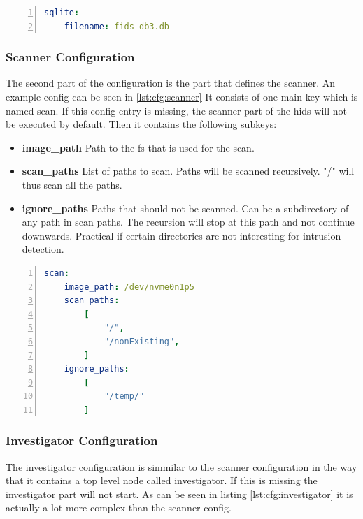 \begin{lstlisting}[language=yaml, numbers=left, caption=SQLite Configuration, label=lst:cfg:sqlite]
sqlite:
	filename: fids_db3.db
\end{lstlisting}

\subsubsection{Scanner Configuration}

The second part of the configuration is the part that defines the scanner. An example config can be seen in \ref{lst:cfg:scanner} It consists of one main key which is named scan. If this config entry is missing, the scanner part of the \gls{hids} will not be executed by default. Then it contains the following subkeys:

\begin{itemize}
	\item		\textbf{image\_path} Path to the \gls{fs} that is used for the scan.
	\item		\textbf{scan\_paths} List of paths to scan. Paths will be scanned recursively. "/" will thus scan all the paths.
	\item		\textbf{ignore\_paths} Paths that should not be scanned. Can be a subdirectory of any path in scan paths. The recursion will stop at this path and not continue downwards. Practical if certain directories are not interesting for intrusion detection.
\end{itemize}

\begin{lstlisting}[language=yaml, numbers=left, caption=Scanner Configuration, label=lst:cfg:scanner]
scan:
	image_path: /dev/nvme0n1p5
	scan_paths: 
		[
			"/",
			"/nonExisting",
		]
	ignore_paths: 
		[
			"/temp/"
		]
\end{lstlisting}

\subsubsection{Investigator Configuration}
\label{sec:conf:investigator}

The investigator configuration is simmilar to the scanner configuration in the way that it contains a top level node called investigator. If this is missing the investigator part will not start. As can be seen in listing \ref{lst:cfg:investigator} it is actually a lot more complex than the scanner config. 

